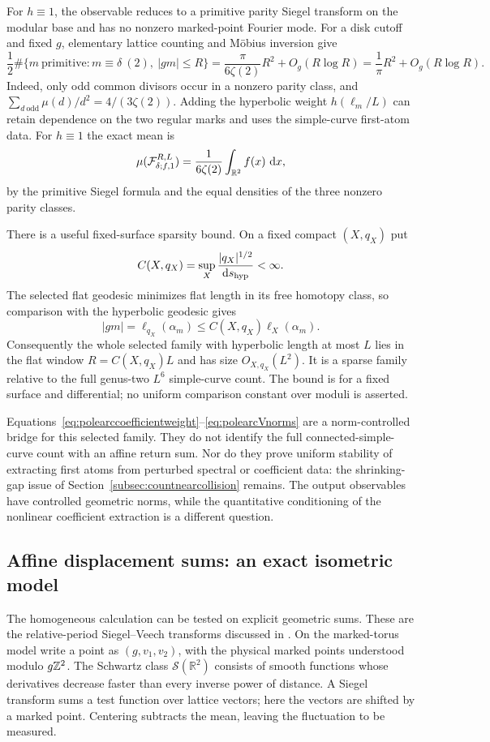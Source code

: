 For $h\equiv1$, the observable reduces to a primitive parity Siegel
transform on the modular base and has no nonzero marked-point Fourier
mode. For a disk cutoff and fixed $g$, elementary lattice counting and
M\"obius inversion give
\[
 \frac12\#\{m\ \mathrm{primitive}:m\equiv\delta\ (2),\ |gm|\leq R\}
 =\frac{\pi}{6\zeta(2)}R^2+O_g(R\log R)
 =\frac1\pi R^2+O_g(R\log R).
\]
Indeed, only odd common divisors occur in a nonzero parity class, and
$\sum_{d\ \mathrm{odd}}\mu(d)/d^2=4/(3\zeta(2))$. Adding the hyperbolic
weight $h(\ell_m/L)$ can retain dependence on the two regular marks and
uses the simple-curve first-atom data. For $h\equiv1$ the exact mean is
\[
 \mu(\mathcal F_{\delta;f,1}^{R,L})
 =\frac1{6\zeta(2)}\int_{\mathbb R^2}f(x)\,\mathop{}\!\mathrm d x,
\]
by the primitive Siegel formula and the equal densities of the three
nonzero parity classes.

There is a useful fixed-surface sparsity bound. On a fixed compact
$(X,q_X)$ put
\[
 C(X,q_X)=\sup_X\frac{|q_X|^{1/2}}{\mathop{}\!\mathrm d s_{\rm hyp}}<\infty.
\]
The selected flat geodesic minimizes flat length in its free homotopy
class, so comparison with the hyperbolic geodesic gives
\[
 |gm|=\ell_{q_X}(\alpha_m)
 \leq C(X,q_X)\ell_X(\alpha_m).
\]
Consequently the whole selected family with hyperbolic length at most
$L$ lies in the flat window $R=C(X,q_X)L$ and has size
$O_{X,q_X}(L^2)$. It is a sparse family relative to the full genus-two
$L^6$ simple-curve count. The bound is for a fixed surface and
differential; no uniform comparison constant over moduli is asserted.

Equations~\eqref{eq:polearccoefficientweight}--\eqref{eq:polearcVnorms}
are a norm-controlled bridge for this selected family. They do not
identify the full connected-simple-curve count with an affine return
sum. Nor do they prove uniform stability of extracting first atoms from
perturbed spectral or coefficient data: the shrinking-gap issue of
Section~\ref{subsec:countnearcollision} remains. The output observables
have controlled geometric norms, while the quantitative conditioning of
the nonlinear coefficient extraction is a different question.

\subsection{Affine displacement sums: an exact isometric model}
\label{subsec:affinedisplacements}

The homogeneous calculation can be tested on explicit geometric sums.
These are the relative-period Siegel--Veech transforms discussed in
\cite[Section~6.1]{AthreyaLagaceMollerRaum}.
On the marked-torus model write a point as $(g,v_1,v_2)$, with the
physical marked points understood modulo $g\mathbb Z^2$. The Schwartz class $\mathscr S(\mathbb R^2)$ consists of smooth
functions whose derivatives decrease faster than every inverse
power of distance. A Siegel transform sums a test function over
lattice vectors; here the vectors are shifted by a marked point.
Centering subtracts the mean, leaving the fluctuation to be measured.

